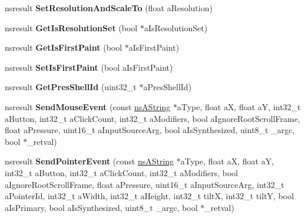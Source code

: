 \begin{DoxyCompactItemize}
\mbox{\label{interfacens_i_d_o_m_window_utils_ac25c3849243cae5e4846750b70131060}} 
nsresult {\bfseries Set\+Resolution\+And\+Scale\+To} (float a\+Resolution)
\item 
\mbox{\label{interfacens_i_d_o_m_window_utils_aa0fb98f9e733197b7c62d583d4bb41d0}} 
nsresult {\bfseries Get\+Is\+Resolution\+Set} (bool $\ast$a\+Is\+Resolution\+Set)
\item 
\mbox{\label{interfacens_i_d_o_m_window_utils_aab485282b5adac2059306fee9df1b7cc}} 
nsresult {\bfseries Get\+Is\+First\+Paint} (bool $\ast$a\+Is\+First\+Paint)
\item 
\mbox{\label{interfacens_i_d_o_m_window_utils_a36577c1e0d85c4c6414456543b5e6c22}} 
nsresult {\bfseries Set\+Is\+First\+Paint} (bool a\+Is\+First\+Paint)
\item 
\mbox{\label{interfacens_i_d_o_m_window_utils_aaa107a645d8bf9541a014f72713cd9d1}} 
nsresult {\bfseries Get\+Pres\+Shell\+Id} (uint32\+\_\+t $\ast$a\+Pres\+Shell\+Id)
\item 
\mbox{\label{interfacens_i_d_o_m_window_utils_a997c710ad53c150536eed70851834044}} 
nsresult {\bfseries Send\+Mouse\+Event} (const \hyperlink{structns_string_container}{ns\+A\+String} $\ast$a\+Type, float aX, float aY, int32\+\_\+t a\+Button, int32\+\_\+t a\+Click\+Count, int32\+\_\+t a\+Modifiers, bool a\+Ignore\+Root\+Scroll\+Frame, float a\+Pressure, uint16\+\_\+t a\+Input\+Source\+Arg, bool a\+Is\+Synthesized, uint8\+\_\+t \+\_\+argc, bool $\ast$\+\_\+retval)
\item 
\mbox{\label{interfacens_i_d_o_m_window_utils_ac338057d94b6c936ec3b346c5b778359}} 
nsresult {\bfseries Send\+Pointer\+Event} (const \hyperlink{structns_string_container}{ns\+A\+String} $\ast$a\+Type, float aX, float aY, int32\+\_\+t a\+Button, int32\+\_\+t a\+Click\+Count, int32\+\_\+t a\+Modifiers, bool a\+Ignore\+Root\+Scroll\+Frame, float a\+Pressure, uint16\+\_\+t a\+Input\+Source\+Arg, int32\+\_\+t a\+Pointer\+Id, int32\+\_\+t a\+Width, int32\+\_\+t a\+Height, int32\+\_\+t tiltX, int32\+\_\+t tiltY, bool a\+Is\+Primary, bool a\+Is\+Synthesized, uint8\+\_\+t \+\_\+argc, bool $\ast$\+\_\+retval)

\end{DoxyCompactItemize}
